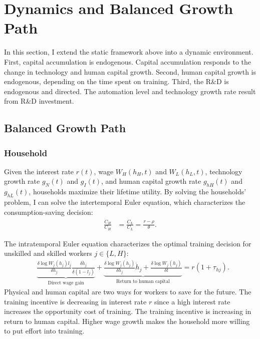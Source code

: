\documentclass[12pt]{article}
\begin{document}
\section{Dynamics and Balanced Growth Path}
In this section, I extend the static framework above into a dynamic environment. First, capital accumulation is endogenous. Capital accumulation responds to the change in technology and human capital growth. Second, human capital growth is endogenous, depending on the time spent on training. Third, the R\&D is endogenous and directed. The automation level and technology growth rate result from R\&D investment.

\subsection{Balanced Growth Path}
\subsubsection*{Household}
Given the interest rate $r(t)$, wage $W_H(h_H,t)$ and $W_L(h_L,t)$, technology growth rate $g_N(t)$ and $g_I(t)$, and human capital growth rate $g_{hH}(t)$ and  $g_{hL}(t)$, households maximize their lifetime utility. By solving the households' problem, I can solve the intertemporal Euler equation, which characterizes the consumption-saving decision: 
\begin{align*}
\frac{\dot{C}_H}{C_H} &= \frac{\dot{C}_L}{C_L}  = \frac{r-\rho}{\theta}.
\end{align*}

The intratemporal Euler equation characterizes the optimal training decision for unskilled and skilled workers $j\in\{L,H\}$:
\begin{align*}
&\underbrace{\frac{\delta \log W_j(h_j)l_j}{\delta h_j}\frac{\delta \dot{h}_j}{\delta (1-l_j)}}_{\text{Direct wage gain}}+\underbrace{\frac{\delta \log W_j(h_j)}{\delta h_j}\dot{h}_j+\frac{\delta \log W_j(h_j)}{\delta t}}_{\text{Return to human capital}}= r(1+\tau_{hj}).
\end{align*}
Physical and human capital are two ways for workers to save for the future. The training incentive is decreasing in interest rate $r$ since a high interest rate increases the opportunity cost of training. The training incentive is increasing in return to human capital. Higher wage growth makes the household more willing to put effort into training.
\end{document}
